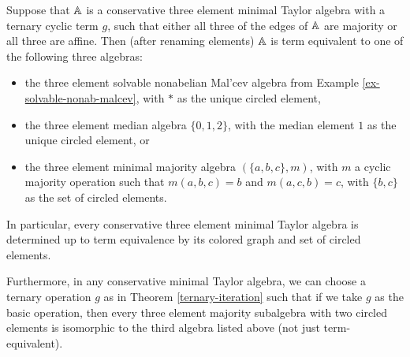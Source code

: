 \documentclass[letterpaper,11pt]{article}
\begin{document}
\begin{thm} Suppose that $\mathbb{A}$ is a conservative three element minimal Taylor algebra with a ternary cyclic term $g$, such that either all three of the edges of $\mathbb{A}$ are majority or all three are affine. Then (after renaming elements) $\mathbb{A}$ is term equivalent to one of the following three algebras:
\begin{itemize}
\item the three element solvable nonabelian Mal'cev algebra from Example \ref{ex-solvable-nonab-malcev}, with $*$ as the unique circled element,
\item the three element median algebra $\{0,1,2\}$, with the median element $1$ as the unique circled element, or
\item the three element minimal majority algebra $(\{a,b,c\}, m)$, with $m$ a cyclic majority operation such that $m(a,b,c) = b$ and $m(a,c,b) = c$, with $\{b,c\}$ as the set of circled elements.
\end{itemize}
In particular, every conservative three element minimal Taylor algebra is determined up to term equivalence by its colored graph and set of circled elements.

Furthermore, in any conservative minimal Taylor algebra, we can choose a ternary operation $g$ as in Theorem \ref{ternary-iteration} such that if we take $g$ as the basic operation, then every three element majority subalgebra with two circled elements is isomorphic to the third algebra listed above (not just term-equivalent).
\end{thm}
\end{document}
